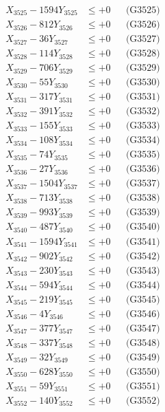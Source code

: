 \documentclass[a4paper,10pt]{article}
\begin{document}
{\begin{align}
X_{3525} - 1594Y_{3525} &\leq +0 && \text{(G3525)} \\
X_{3526} - 812Y_{3526} &\leq +0 && \text{(G3526)} \\
X_{3527} - 36Y_{3527} &\leq +0 && \text{(G3527)} \\
X_{3528} - 114Y_{3528} &\leq +0 && \text{(G3528)} \\
X_{3529} - 706Y_{3529} &\leq +0 && \text{(G3529)} \\
X_{3530} - 55Y_{3530} &\leq +0 && \text{(G3530)} \\
\allowbreak
X_{3531} - 317Y_{3531} &\leq +0 && \text{(G3531)} \\
X_{3532} - 391Y_{3532} &\leq +0 && \text{(G3532)} \\
X_{3533} - 155Y_{3533} &\leq +0 && \text{(G3533)} \\
X_{3534} - 108Y_{3534} &\leq +0 && \text{(G3534)} \\
X_{3535} - 74Y_{3535} &\leq +0 && \text{(G3535)} \\
X_{3536} - 27Y_{3536} &\leq +0 && \text{(G3536)} \\
X_{3537} - 1504Y_{3537} &\leq +0 && \text{(G3537)} \\
X_{3538} - 713Y_{3538} &\leq +0 && \text{(G3538)} \\
X_{3539} - 993Y_{3539} &\leq +0 && \text{(G3539)} \\
X_{3540} - 487Y_{3540} &\leq +0 && \text{(G3540)} \\
\allowbreak
X_{3541} - 1594Y_{3541} &\leq +0 && \text{(G3541)} \\
X_{3542} - 902Y_{3542} &\leq +0 && \text{(G3542)} \\
X_{3543} - 230Y_{3543} &\leq +0 && \text{(G3543)} \\
X_{3544} - 594Y_{3544} &\leq +0 && \text{(G3544)} \\
X_{3545} - 219Y_{3545} &\leq +0 && \text{(G3545)} \\
X_{3546} - 4Y_{3546} &\leq +0 && \text{(G3546)} \\
X_{3547} - 377Y_{3547} &\leq +0 && \text{(G3547)} \\
X_{3548} - 337Y_{3548} &\leq +0 && \text{(G3548)} \\
X_{3549} - 32Y_{3549} &\leq +0 && \text{(G3549)} \\
X_{3550} - 628Y_{3550} &\leq +0 && \text{(G3550)} \\
\allowbreak
X_{3551} - 59Y_{3551} &\leq +0 && \text{(G3551)} \\
X_{3552} - 140Y_{3552} &\leq +0 && \text{(G3552)} \\

\end{align}}
\end{document}
